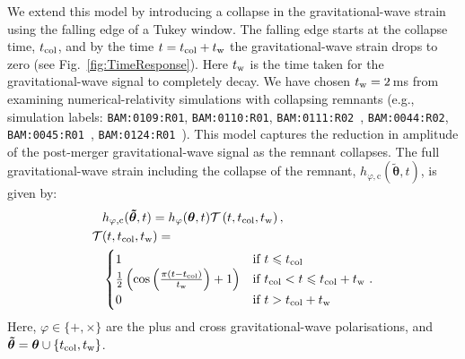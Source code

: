 \documentclass[../Thesis.tex]{subfiles}
\begin{document}
    We extend this model by introducing a collapse in the gravitational-wave strain using the falling edge of a Tukey window.
    The falling edge starts at the collapse time, $t_{\mathrm{col}}$, and by the time $t=t_{\mathrm{col}}+t_{\mathrm{w}}$ the gravitational-wave strain drops to zero (see Fig.~\ref{fig:TimeResponse}). 
    Here $t_{\mathrm{w}}$ is the time taken for the gravitational-wave signal to completely decay.
    We have chosen $t_{\mathrm{w}}=2$\,ms from examining numerical-relativity simulations with collapsing remnants (e.g., simulation labels: \texttt{BAM:0109:R01}, \texttt{BAM:0110:R01}, \texttt{BAM:0111:R02}~\cite{Dietrich2018}, \texttt{BAM:0044:R02}, \texttt{BAM:0045:R01}~\cite{Dietrich2017a}, \texttt{BAM:0124:R01}~\cite{Dietrich2017b}).
    This model captures the reduction in amplitude of the post-merger gravitational-wave signal as the remnant collapses.
    The full gravitational-wave strain including the collapse of the remnant, $h_{\varphi,\mathrm{c}}(\boldsymbol{\tilde{\theta}},t)$, is given by:
\begin{align}
        & h_{\varphi,\mathrm{c}}(\boldsymbol{\tilde{\theta}},t)    =  h_{\varphi}(\boldsymbol{\theta},t)\mathcal{T}\left(t , t_{\mathrm{col}},t_{\mathrm{w}}\right), \label{eq:hcol3}\\ 
        \mathcal{T} & (t,t_{\mathrm{col}},t_{\mathrm{w}}) =    \nonumber  \\
        &\begin{cases} 
            1 &\text{if}\ t \leqslant  t_{\mathrm{col}} \\ 
            \frac{1}{2}\left(\cos\left(\frac{\pi (t-t_{\mathrm{col}})}{t_{\mathrm{w}}}\right) +1 \right)  &\text{if}\ t_{\mathrm{col}} < t \leqslant t_{\mathrm{col}}+t_{\mathrm{w}}\ \text{.} \label{eq:tukeyfallingedge3} \\
            0  &\text{if}\  t > t_{\mathrm{col}}+t_{\mathrm{w}}\\ 
        \end{cases}
\end{align}
    Here, $\varphi\in\{+,\times\}$ are the plus and cross gravitational-wave polarisations, and $\boldsymbol{\tilde{\theta}}= \boldsymbol{\theta} \cup \{t_{\mathrm{col}},t_{\mathrm{w}}\}$. \par
    
\end{document}

